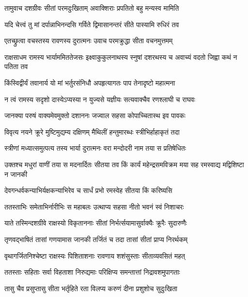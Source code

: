 \twolineshloka
{तामुवाच दशग्रीवः सीतां परमदुःखिताम्}
{अवाक्शिराः प्रपतितो बहु मन्यस्व मामिति} %

\twolineshloka
{यदि चेत्त्वं तु मां दर्पान्नाभिनन्दसि गर्विते}
{द्विमासानन्तरं सीते पास्यामि रुधिरं तव} %

\twolineshloka
{एतच्छ्रुत्वा वचस्तस्य रावणस्य दुरात्मनः}
{उवाच परमक्रुद्धा सीता वचनमुत्तमम्} %

\threelineshloka
{राक्षसाधम रामस्य भार्याममिततेजसः}
{इक्ष्वाकुकुलनाथस्य स्नुषां दशरथस्य च}
{अवाच्यं वदतो जिह्वा कथं न पतिता तव} %

\twolineshloka
{किंस्विद्वीर्यं तवानार्य यो मां भर्तुरसंनिधौ}
{अपहृत्यागतः पाप तेनादृष्टो महात्मना} %

\twolineshloka
{न त्वं रामस्य सदृशो दास्येऽप्यस्या न युज्यसे}
{यज्ञीयः सत्यवाक्चैव रणश्लाघी च राघवः} %

\twolineshloka
{जानक्या परुषं वाक्यमेवमुक्तो दशाननः}
{जज्वाल सहसा कोपाच्चितास्थ इव पावकः} %

\twolineshloka
{विवृत्य नयने क्रूरे मुष्टिमुद्यम्य दक्षिणम्}
{मैथिलीं हन्तुमारब्धः स्त्रीभिर्हाहाकृतं तदा} %

\twolineshloka
{स्त्रीणां मध्यात्समुत्पत्य तस्य भार्या दुरात्मनः}
{वरा मन्दोदरी नाम तया स प्रतिषेधितः} %

\threelineshloka
{उक्तश्च मधुरां वाणीं तया स मदनार्दितः}
{सीतया तव किं कार्यं महेन्द्रसमविक्रम}
{मया सह रमस्वाद्य मद्विशिष्टा न जानकी} %

\twolineshloka
{देवगन्धर्वकन्याभिर्यक्षकन्याभिरेव च}
{सार्धं प्रभो रमस्वेह सीतया किं करिष्यसि} %

\twolineshloka
{ततस्ताभिः समेताभिर्नारीभिः स महाबलः}
{उत्थाप्य सहसा नीतो भवनं स्वं निशाचरः} %

\twolineshloka
{याते तस्मिन्दशग्रीवे राक्षस्यो विकृताननाः}
{सीतां निर्भर्त्सयामासुर्वाक्यैः क्रूरैः सुदारुणैः} %

\twolineshloka
{तृणवद्भाषितं तासां गणयामास जानकी}
{तर्जितं च तदा तासां सीतां प्राप्य निरर्थकम्} %

\twolineshloka
{वृथागर्जितनिश्चेष्टा राक्षस्यः पिशिताशनाः}
{रावणाय शशंसुस्ताः सीताव्यवसितं महत्} %

\twolineshloka
{ततस्ताः सहिताः सर्वा विहताशा निरुद्यमाः}
{परिक्षिप्य समन्तात्तां निद्रावशमुपागताः} %

\twolineshloka
{तासु चैव प्रसुप्तासु सीता भर्तृहिते रता}
{विलप्य करुणं दीना प्रशुशोच सुदुःखिता} %

